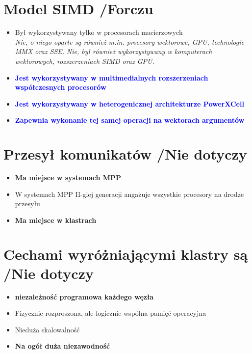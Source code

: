 \section{Model SIMD  {\small /Forczu}}
	\begin{itemize}
    \item Był wykorzystywany tylko w procesorach macierzowych\\
    {\small \emph{Nie, o niego oparte są również m.in. procesory wektorowe, GPU, technologie MMX oraz SSE.}}
    {\small \emph{Nie, był również wykorzystywany w komputerach wektorowych, rozszerzeniach SIMD oraz GPU.}}
    \item \textcolor{Blue}{\textbf{Jest wykorzystywany w multimedialnych rozszerzeniach współczesnych procesorów}}
    \item \textcolor{Blue}{\textbf{Jest wykorzystywany w heterogenicznej architekturze PowerXCell}}
    \item \textcolor{Blue}{\textbf{Zapewnia wykonanie tej samej operacji na wektorach argumentów}}
    \end{itemize}

\section{Przesył komunikatów {\small /Nie dotyczy}}
	\begin{itemize}
    \item \textbf{Ma miejsce w systemach MPP}
    \item W systemach MPP II-giej generacji angażuje wszystkie procesory na drodze przesyłu
    \item \textbf{Ma miejsce w klastrach}
    \end{itemize}

\section{Cechami wyróżniającymi klastry są {\small /Nie dotyczy}}
	\begin{itemize}
    \item \textbf{niezależność programowa każdego węzła}
    \item Fizycznie rozproszona, ale logicznie wspólna pamięć operacyjna
    \item Nieduża skalowalność
    \item \textbf{Na ogół duża niezawodność}
    \end{itemize}

